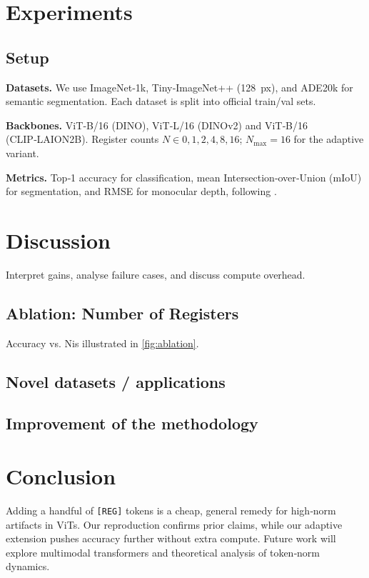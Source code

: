 \documentclass{article}
\newcommand{\RegTok}{\texttt{[REG]}\xspace}
\newcommand{\nreg}{N}
\begin{document}
\section{Experiments}
\label{sec:experiments}
\subsection{Setup}
\textbf{Datasets.}  We use ImageNet‑1k, Tiny‑ImageNet++ (\SI{128}{px}), and ADE20k for semantic segmentation.  Each dataset is split into official train/val sets.

\textbf{Backbones.}  ViT‑B/16 (DINO), ViT‑L/16 (DINOv2) and ViT‑B/16 (CLIP‑LAION2B).  Register counts $\nreg\in{0,1,2,4,8,16}$; $\nreg_{\max}=16$ for the adaptive variant.

\textbf{Metrics.}  Top‑1 accuracy for classification, mean Intersection‑over‑Union (mIoU) for segmentation, and RMSE for monocular depth, following \cite{darcetVisionTransformersNeed2024}.

\section{Discussion}
\label{sec:discussion}
Interpret gains, analyse failure cases, and discuss compute overhead.

\subsection{Ablation: Number of Registers}
Accuracy vs. \nreg is illustrated in \cref{fig:ablation}.

\subsection{Novel datasets / applications} \label{sec:novel_datasets}

\subsection{Improvement of the methodology} \label{sec:improvement}

\section{Conclusion}
Adding a handful of \RegTok tokens is a cheap, general remedy for high‑norm artifacts in ViTs.  Our reproduction confirms prior claims, while our adaptive extension pushes accuracy further without extra compute.  Future work will explore multimodal transformers and theoretical analysis of token‑norm dynamics.
\end{document}
